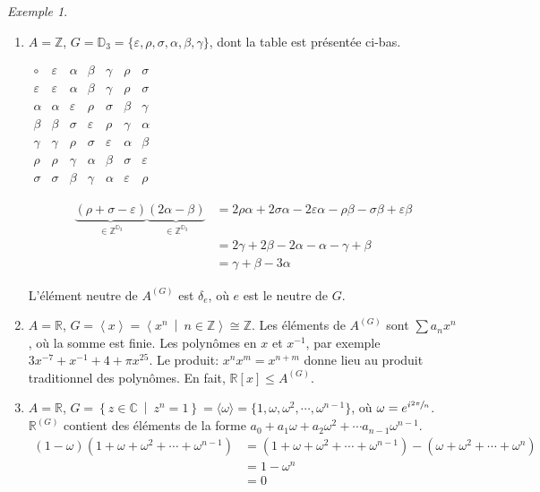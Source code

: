 \documentclass{report}
\theoremstyle{definition}
\theoremstyle{remark}
\newtheorem*{exem}{Exemple}
\def\lte{\leqslant}
\def\ZZ{\mathbb{Z}}
\def\RR{\mathbb{R}}
\def\CC{\mathbb{C}}
\begin{document}
	\begin{exem}
		\begin{enumerate}
			\item $A=\ZZ$, $G=\mathbb{D}_3 = \{\varepsilon, \rho, \sigma, \alpha, \beta, \gamma\}$, dont la table est pr\'esent\'ee ci-bas.
			\begin{table}[h]
				\centering
				$\begin{array}{c||c|c|c|c|c|c}
					\circ&\varepsilon&\alpha&\beta&\gamma&\rho&\sigma\\
					\hline\hline
					\varepsilon&\varepsilon&\alpha&\beta&\gamma&\rho&\sigma\\
					\hline
					\alpha&\alpha&\varepsilon&\rho&\sigma&\beta&\gamma\\
					\hline
					\beta&\beta&\sigma&\varepsilon&\rho&\gamma&\alpha\\
					\hline
					\gamma&\gamma&\rho&\sigma&\varepsilon&\alpha&\beta\\
					\hline
					\rho&\rho&\gamma&\alpha&\beta&\sigma&\varepsilon\\
					\hline
					\sigma&\sigma&\beta&\gamma&\alpha&\varepsilon&\rho
				\end{array}$
				\caption{Table de $\mathbb{D}_3$}
			\end{table}
			\begin{align*}
				\underbrace{\left( \rho+\sigma-\varepsilon \right)}_{\in \ZZ^{\mathbb{D}_3}} \underbrace{\left( 2\alpha-\beta \right)}_{\in \ZZ^{\mathbb{D}_3}}&= 2\rho\alpha + 2\sigma\alpha - 2\varepsilon\alpha - \rho\beta - \sigma\beta + \varepsilon\beta\\
				&= 2\gamma + 2\beta - 2\alpha - \alpha - \gamma + \beta\\
				&= \gamma + \beta - 3\alpha
			\end{align*}

			L'\'el\'ement neutre de $A^{(G)}$ est $\delta_e$, o\`u $e$ est le neutre de $G$.
			\item $A = \RR$, $G=\left\langle x \right\rangle = \left\langle x^n ~\middle|~ n \in \ZZ \right\rangle \cong \ZZ$. Les \'el\'ements de $A^{(G)}$ sont $\sum a_nx^n$, o\`u la somme est finie. Les polyn\^omes en $x$ et $x^{-1}$, par exemple $3x^{-7}+x^{-1}+4+\pi x^{25}$. Le produit: $x^nx^m=x^{n+m}$ donne lieu au produit traditionnel des polyn\^omes. En fait, $\RR[x] \lte A^{(G)}$.
			\item $A=\RR$, $G=\left\{ z \in \CC ~\middle|~ z^n=1 \right\} = \langle\omega\rangle = \{1,\omega,\omega^2,\cdots,\omega^{n-1}\}$, o\`u $\omega=e^{i\sfrac{2\pi}{n}}$. $\RR^{(G)}$ contient des \'el\'ements de la forme $a_0 + a_1\omega + a_2\omega^2 + \cdots a_{n-1}\omega^{n-1}$.
			\begin{align*}
				(1-\omega)(1+\omega+\omega^2+\cdots+\omega^{n-1})&= (1+\omega+\omega^2+\cdots+\omega^{n-1}) - (\omega+\omega^2+\cdots+\omega^n)\\
				&= 1-\omega^n\\
				&= 0
			\end{align*}
		\end{enumerate}
	\end{exem}
\end{document}
